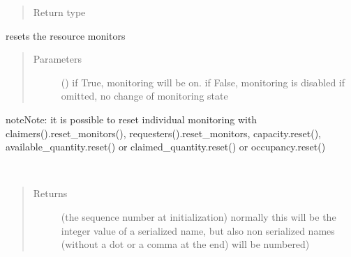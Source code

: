 \documentclass[letterpaper,10pt,english]{sphinxmanual}
\begin{document}
\begin{fulllineitems}
\begin{fulllineitems}
\begin{quote}
\begin{description}
\item[{Return type}] \leavevmode
{\hyperref[\detokenize{Reference:salabim.Queue}]{}}

\end{description}\end{quote}

\end{fulllineitems}


\begin{fulllineitems}
\label{\detokenize{Reference:salabim.Resource.reset_monitors}}
resets the resource monitors
\begin{quote}\begin{description}
\item[{Parameters}] \leavevmode
{} () \textendash{} if True, monitoring will be on. 
if False, monitoring is disabled 
if omitted, no change of monitoring state

\end{description}\end{quote}

\begin{sphinxadmonition}{note}{Note:}
it is possible to reset individual monitoring with
claimers().reset\_monitors(),
requesters().reset\_monitors,
capacity.reset(),
available\_quantity.reset() or
claimed\_quantity.reset() or
occupancy.reset()
\end{sphinxadmonition}

\end{fulllineitems}


\begin{fulllineitems}
\label{\detokenize{Reference:salabim.Resource.sequence_number}}~\begin{quote}\begin{description}
\item[{Returns}] \leavevmode
{} \textendash{} (the sequence number at initialization) 
normally this will be the integer value of a serialized name,
but also non serialized names (without a dot or a comma at the end)
will be numbered)


\end{description}
\end{quote}
\end{fulllineitems}
\end{fulllineitems}
\end{document}
